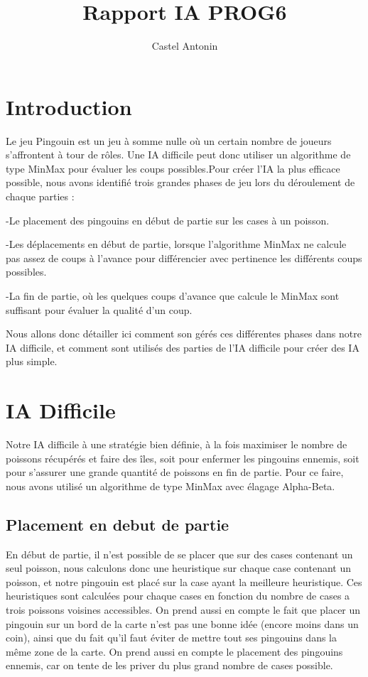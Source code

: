 \documentclass{report}
\title{Rapport IA PROG6}
\author{Castel Antonin}
\begin{document}
\maketitle{}

\chapter{Introduction}
Le jeu Pingouin est un jeu à somme nulle où un certain nombre de joueurs s'affrontent à tour de rôles. Une IA difficile peut donc utiliser un algorithme de type MinMax pour évaluer les coups possibles.Pour créer l'IA la plus efficace possible, nous avons identifié trois grandes phases de jeu lors du déroulement de chaque parties :
\newline

-Le placement des pingouins en début de partie sur les cases à un poisson.


-Les déplacements en début de partie, lorsque l'algorithme MinMax ne calcule 
pas assez de coups à l'avance pour différencier avec pertinence les différents coups possibles.


-La fin de partie, où les quelques coups d'avance que calcule le MinMax sont 
suffisant pour évaluer la qualité d'un coup.

Nous allons donc détailler ici comment son gérés ces différentes phases dans notre IA difficile, et comment sont utilisés des parties de l'IA difficile pour créer des IA plus simple.
\chapter{IA Difficile}
Notre IA difficile à une stratégie bien définie, à la fois maximiser le nombre de poissons récupérés et faire des îles, soit pour enfermer les pingouins ennemis, soit pour s'assurer une grande quantité de poissons en fin de partie.
Pour ce faire, nous avons utilisé un algorithme de type MinMax avec élagage Alpha-Beta.
\section{Placement en debut de partie}
En début de partie, il n'est possible de se placer que sur des cases contenant un seul poisson, nous calculons donc une heuristique sur chaque case contenant un poisson, et notre pingouin est placé sur la case ayant la meilleure heuristique.
Ces heuristiques sont calculées pour chaque cases en fonction du nombre de cases a trois poissons voisines accessibles. 
\newline
On prend aussi en compte le fait que placer un pingouin sur un bord de la carte n'est pas une bonne idée (encore moins dans un coin), ainsi que du fait qu'il faut éviter de mettre tout ses pingouins dans la même zone de la carte.
\newline
On prend aussi en compte le placement des pingouins ennemis, car on tente de les priver du plus grand nombre de cases possible.
\end{document}
